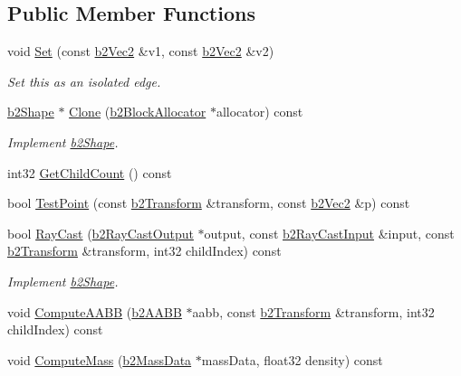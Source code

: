 \subsection*{Public Member Functions}
\begin{DoxyCompactItemize}
\item 
\hypertarget{classb2_edge_shape_a67dd3b17630a600033cb4380697a4e9d}{void \hyperlink{classb2_edge_shape_a67dd3b17630a600033cb4380697a4e9d}{Set} (const \hyperlink{structb2_vec2}{b2\-Vec2} \&v1, const \hyperlink{structb2_vec2}{b2\-Vec2} \&v2)}\label{classb2_edge_shape_a67dd3b17630a600033cb4380697a4e9d}

\begin{DoxyCompactList}\small\item\em Set this as an isolated edge. \end{DoxyCompactList}\item 
\hypertarget{classb2_edge_shape_a70ce8532bab35dce4367d3717ae024b3}{\hyperlink{classb2_shape}{b2\-Shape} $\ast$ \hyperlink{classb2_edge_shape_a70ce8532bab35dce4367d3717ae024b3}{Clone} (\hyperlink{classb2_block_allocator}{b2\-Block\-Allocator} $\ast$allocator) const }\label{classb2_edge_shape_a70ce8532bab35dce4367d3717ae024b3}

\begin{DoxyCompactList}\small\item\em Implement \hyperlink{classb2_shape}{b2\-Shape}. \end{DoxyCompactList}\item 
int32 \hyperlink{classb2_edge_shape_a8c15a5a5aa8e7dc69826be17aaa82293}{Get\-Child\-Count} () const 
\item 
bool \hyperlink{classb2_edge_shape_a28a977f82e4bc1cf60a3143ba5636c22}{Test\-Point} (const \hyperlink{structb2_transform}{b2\-Transform} \&transform, const \hyperlink{structb2_vec2}{b2\-Vec2} \&p) const 
\item 
\hypertarget{classb2_edge_shape_aefbae6b3840f486b22ffecee7d0d15fd}{bool \hyperlink{classb2_edge_shape_aefbae6b3840f486b22ffecee7d0d15fd}{Ray\-Cast} (\hyperlink{structb2_ray_cast_output}{b2\-Ray\-Cast\-Output} $\ast$output, const \hyperlink{structb2_ray_cast_input}{b2\-Ray\-Cast\-Input} \&input, const \hyperlink{structb2_transform}{b2\-Transform} \&transform, int32 child\-Index) const }\label{classb2_edge_shape_aefbae6b3840f486b22ffecee7d0d15fd}

\begin{DoxyCompactList}\small\item\em Implement \hyperlink{classb2_shape}{b2\-Shape}. \end{DoxyCompactList}\item 
void \hyperlink{classb2_edge_shape_a30f601c611eb549f9f657eee89d82f9f}{Compute\-A\-A\-B\-B} (\hyperlink{structb2_a_a_b_b}{b2\-A\-A\-B\-B} $\ast$aabb, const \hyperlink{structb2_transform}{b2\-Transform} \&transform, int32 child\-Index) const 
\item 
void \hyperlink{classb2_edge_shape_a3a305707a07ca3dffa6f2eaff3735dff}{Compute\-Mass} (\hyperlink{structb2_mass_data}{b2\-Mass\-Data} $\ast$mass\-Data, float32 density) const 
\end{DoxyCompactItemize}
